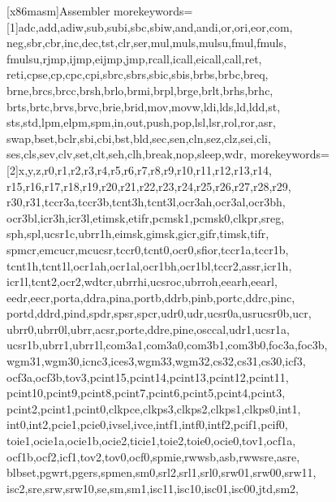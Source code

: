 

 [x86masm]{Assembler}{
morekeywords=[1]{adc,add,adiw,sub,subi,sbc,sbiw,and,andi,or,ori,eor,com,
                neg,sbr,cbr,inc,dec,tst,clr,ser,mul,muls,mulsu,fmul,fmuls,
                fmulsu,rjmp,ijmp,eijmp,jmp,rcall,icall,eicall,call,ret,
                reti,cpse,cp,cpc,cpi,sbrc,sbrs,sbic,sbis,brbs,brbc,breq,
                brne,brcs,brcc,brsh,brlo,brmi,brpl,brge,brlt,brhs,brhc,
                brts,brtc,brvs,brvc,brie,brid,mov,movw,ldi,lds,ld,ldd,st,
                sts,std,lpm,elpm,spm,in,out,push,pop,lsl,lsr,rol,ror,asr,
                swap,bset,bclr,sbi,cbi,bst,bld,sec,sen,cln,sez,clz,sei,cli,
                ses,cls,sev,clv,set,clt,seh,clh,break,nop,sleep,wdr},%
morekeywords=[2]{x,y,z,r0,r1,r2,r3,r4,r5,r6,r7,r8,r9,r10,r11,r12,r13,r14,
                r15,r16,r17,r18,r19,r20,r21,r22,r23,r24,r25,r26,r27,r28,r29,
                r30,r31,tccr3a,tccr3b,tcnt3h,tcnt3l,ocr3ah,ocr3al,ocr3bh,
                ocr3bl,icr3h,icr3l,etimsk,etifr,pcmsk1,pcmsk0,clkpr,sreg,
                sph,spl,ucsr1c,ubrr1h,eimsk,gimsk,gicr,gifr,timsk,tifr,
                spmcr,emcucr,mcucsr,tccr0,tcnt0,ocr0,sfior,tccr1a,tccr1b,
                tcnt1h,tcnt1l,ocr1ah,ocr1al,ocr1bh,ocr1bl,tccr2,assr,icr1h,
                icr1l,tcnt2,ocr2,wdtcr,ubrrhi,ucsroc,ubrroh,eearh,eearl,
                eedr,eecr,porta,ddra,pina,portb,ddrb,pinb,portc,ddrc,pinc,
                portd,ddrd,pind,spdr,spsr,spcr,udr0,udr,ucsr0a,usrucsr0b,ucr,
                ubrr0,ubrr0l,ubrr,acsr,porte,ddre,pine,osccal,udr1,ucsr1a,
                ucsr1b,ubrr1,ubrr1l,com3a1,com3a0,com3b1,com3b0,foc3a,foc3b,
                wgm31,wgm30,icnc3,ices3,wgm33,wgm32,cs32,cs31,cs30,icf3,
                ocf3a,ocf3b,tov3,pcint15,pcint14,pcint13,pcint12,pcint11,
                pcint10,pcint9,pcint8,pcint7,pcint6,pcint5,pcint4,pcint3,
                pcint2,pcint1,pcint0,clkpce,clkps3,clkps2,clkps1,clkps0,int1,
                int0,int2,pcie1,pcie0,ivsel,ivce,intf1,intf0,intf2,pcif1,pcif0,
                toie1,ocie1a,ocie1b,ocie2,ticie1,toie2,toie0,ocie0,tov1,ocf1a,
                ocf1b,ocf2,icf1,tov2,tov0,ocf0,spmie,rwwsb,asb,rwwsre,asre,
                blbset,pgwrt,pgers,spmen,sm0,srl2,srl1,srl0,srw01,srw00,srw11,
                isc2,sre,srw,srw10,se,sm,sm1,isc11,isc10,isc01,isc00,jtd,sm2,
}}
